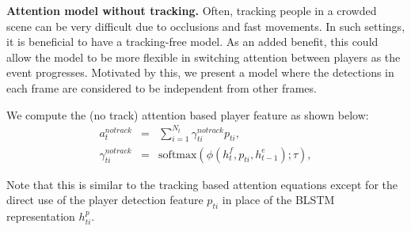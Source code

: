 
\noindent \textbf{Attention model without tracking.}
Often, tracking people in a crowded scene can be very difficult due to
occlusions and fast movements. In such settings, it is beneficial to have a
tracking-free model.  As an added benefit, this could allow the model to be
more flexible in switching attention between players as the event progresses.
Motivated by this, we present a model where the detections in each frame are
considered to be independent from other frames. 

We  compute the (no track) attention based player feature as shown below:
\begin{eqnarray} 
\label{eq:notrack}
  a_t^{notrack} & = & \sum_{i=1}^{N_t} \gamma_{ti}^{notrack} p_{ti},
\\ \nonumber
  \gamma_{ti}^{notrack} & = & \text{softmax} \left(\phi\left(h^f_t, p_{ti}, h^e_{t-1}\right); \tau\right),
\end{eqnarray}

Note that this is similar to the tracking based attention equations except for
the direct use of the player detection feature $p_{ti}$ in place of the
BLSTM representation $h_{ti}^p$.

